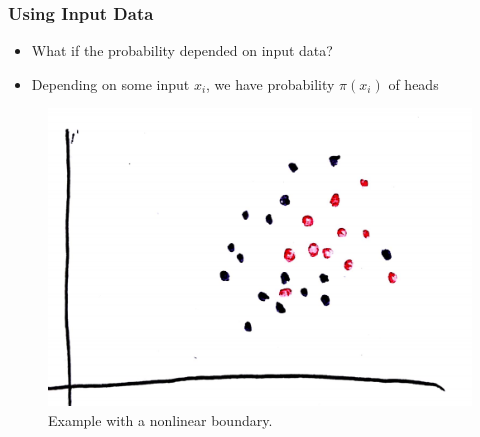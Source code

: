 \documentclass[10pt,mathserif]{beamer}
\begin{document}
\begin{frame}
  \frametitle{Using Input Data}
  \begin{itemize}
  \item What if the probability depended on input data?
  \item Depending on some input $x_i$, we have probability $\pi\left(x_i\right)$
    of heads
  \end{itemize}
  \begin{figure}
    \centering
    \includegraphics[width=0.45\paperwidth]{figure/logistic_scatter_nonlinear_points}
    \caption{Example with a nonlinear
      boundary. \label{fig:logistic_nonlinear_scatter_points} }
  \end{figure}
\end{frame}
\end{document}
